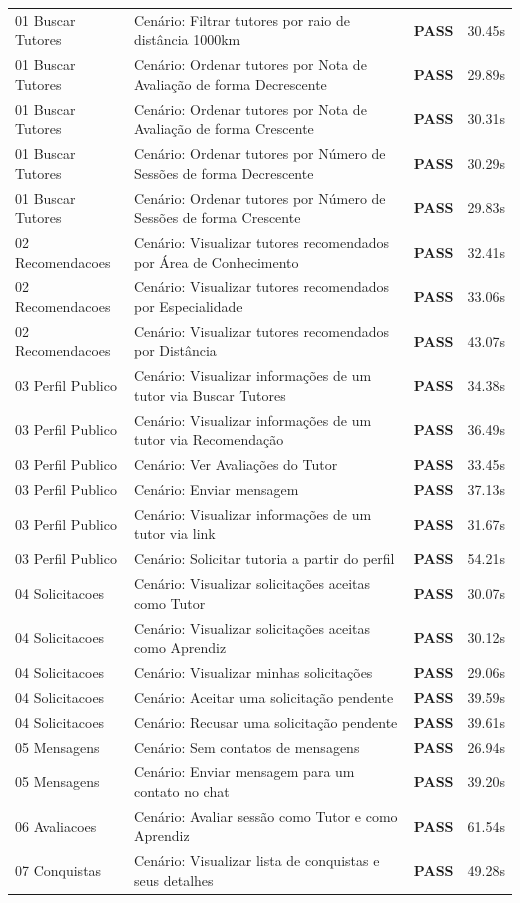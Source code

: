 \begin{landscape}
\begin{longtable}{llcc}
01 Buscar Tutores & Cenário: Filtrar tutores por raio de distância 1000km & \textbf{PASS} & 30.45s \\
01 Buscar Tutores & Cenário: Ordenar tutores por Nota de Avaliação de forma Decrescente & \textbf{PASS} & 29.89s \\
01 Buscar Tutores & Cenário: Ordenar tutores por Nota de Avaliação de forma Crescente & \textbf{PASS} & 30.31s \\
01 Buscar Tutores & Cenário: Ordenar tutores por Número de Sessões de forma Decrescente & \textbf{PASS} & 30.29s \\
01 Buscar Tutores & Cenário: Ordenar tutores por Número de Sessões de forma Crescente & \textbf{PASS} & 29.83s \\
02 Recomendacoes & Cenário: Visualizar tutores recomendados por Área de Conhecimento & \textbf{PASS} & 32.41s \\
02 Recomendacoes & Cenário: Visualizar tutores recomendados por Especialidade & \textbf{PASS} & 33.06s \\
02 Recomendacoes & Cenário: Visualizar tutores recomendados por Distância & \textbf{PASS} & 43.07s \\
03 Perfil Publico & Cenário: Visualizar informações de um tutor via Buscar Tutores & \textbf{PASS} & 34.38s \\
03 Perfil Publico & Cenário: Visualizar informações de um tutor via Recomendação & \textbf{PASS} & 36.49s \\
03 Perfil Publico & Cenário: Ver Avaliações do Tutor & \textbf{PASS} & 33.45s \\
03 Perfil Publico & Cenário: Enviar mensagem & \textbf{PASS} & 37.13s \\
03 Perfil Publico & Cenário: Visualizar informações de um tutor via link & \textbf{PASS} & 31.67s \\
03 Perfil Publico & Cenário: Solicitar tutoria a partir do perfil & \textbf{PASS} & 54.21s \\
04 Solicitacoes & Cenário: Visualizar solicitações aceitas como Tutor & \textbf{PASS} & 30.07s \\
04 Solicitacoes & Cenário: Visualizar solicitações aceitas como Aprendiz & \textbf{PASS} & 30.12s \\
04 Solicitacoes & Cenário: Visualizar minhas solicitações & \textbf{PASS} & 29.06s \\
04 Solicitacoes & Cenário: Aceitar uma solicitação pendente & \textbf{PASS} & 39.59s \\
04 Solicitacoes & Cenário: Recusar uma solicitação pendente & \textbf{PASS} & 39.61s \\
05 Mensagens & Cenário: Sem contatos de mensagens & \textbf{PASS} & 26.94s \\
05 Mensagens & Cenário: Enviar mensagem para um contato no chat & \textbf{PASS} & 39.20s \\
06 Avaliacoes & Cenário: Avaliar sessão como Tutor e como Aprendiz & \textbf{PASS} & 61.54s \\
07 Conquistas & Cenário: Visualizar lista de conquistas e seus detalhes & \textbf{PASS} & 49.28s \\
\bottomrule
\end{longtable}
\end{landscape}

